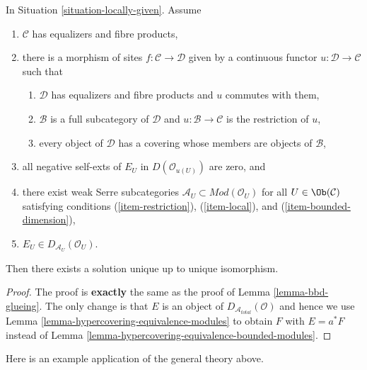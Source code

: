 \begin{lemma}
\label{lemma-bbd-unbounded-glueing}
In Situation \ref{situation-locally-given}. Assume
\begin{enumerate}
\item $\mathcal{C}$ has equalizers and fibre products,
\item there is a morphism of sites $f : \mathcal{C} \to \mathcal{D}$
given by a continuous functor $u : \mathcal{D} \to \mathcal{C}$
such that
\begin{enumerate}
\item $\mathcal{D}$ has equalizers and fibre products and $u$
commutes with them,
\item $\mathcal{B}$ is a full subcategory of $\mathcal{D}$
and $u : \mathcal{B} \to \mathcal{C}$ is the restriction of $u$,
\item every object of $\mathcal{D}$ has a covering whose members
are objects of $\mathcal{B}$,
\end{enumerate}
\item all negative self-exts of $E_U$ in $D(\mathcal{O}_{u(U)})$ are zero, and
\item there exist weak Serre subcategories
$\mathcal{A}_U \subset \textit{Mod}(\mathcal{O}_U)$ for all
$U \in \Ob(\mathcal{C})$ satisfying conditions (\ref{item-restriction}),
(\ref{item-local}), and (\ref{item-bounded-dimension}),
\item $E_U \in D_{\mathcal{A}_U}(\mathcal{O}_U)$.
\end{enumerate}
Then there exists a solution unique up to unique isomorphism.
\end{lemma}

\begin{proof}
The proof is {\bf exactly} the same as the proof of
Lemma \ref{lemma-bbd-glueing}. The only change is that
$E$ is an object of $D_{\mathcal{A}_{total}}(\mathcal{O})$
and hence we use Lemma \ref{lemma-hypercovering-equivalence-modules}
to obtain $F$ with $E = a^*F$
instead of Lemma \ref{lemma-hypercovering-equivalence-bounded-modules}.
\end{proof}

\noindent
Here is an example application of the general theory above.

